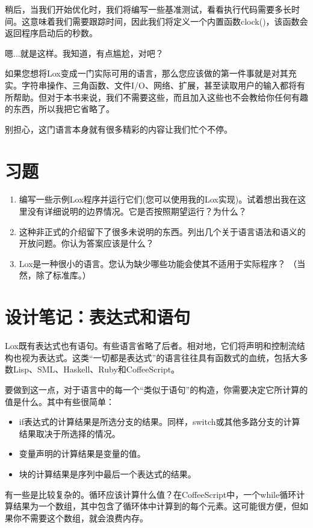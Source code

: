\documentclass[cn,11pt,chinese]{elegantbook}
\begin{document}
稍后，当我们开始优化时，我们将编写一些基准测试，看看执行代码需要多长时间。这意味着我们需要跟踪时间，因此我们将定义一个内置函数clock()，该函数会返回程序启动后的秒数。

嗯...就是这样。我知道，有点尴尬，对吧？ 

如果您想将Lox变成一门实际可用的语言，那么您应该做的第一件事就是对其充实。字符串操作、三角函数、文件I/O、网络、扩展，甚至读取用户的输入都将有所帮助。但对于本书来说，我们不需要这些，而且加入这些也不会教给你任何有趣的东西，所以我把它省略了。

别担心，这门语言本身就有很多精彩的内容让我们忙个不停。

\section{习题}

\begin{enumerate}
  \item 编写一些示例Lox程序并运行它们(您可以使用我的Lox实现)。试着想出我在这里没有详细说明的边界情况。它是否按照期望运行？为什么？
  \item 这种非正式的介绍留下了很多未说明的东西。列出几个关于语言语法和语义的开放问题。你认为答案应该是什么？
  \item Lox是一种很小的语言。您认为缺少哪些功能会使其不适用于实际程序？ （当然，除了标准库。）
\end{enumerate}

\section{设计笔记：表达式和语句}

Lox既有表达式也有语句。有些语言省略了后者。相对地，它们将声明和控制流结构也视为表达式。这类“一切都是表达式”的语言往往具有函数式的血统，包括大多数Lisp、SML、Haskell、Ruby和CoffeeScript。

要做到这一点，对于语言中的每一个“类似于语句”的构造，你需要决定它所计算的值是什么。其中有些很简单：

\begin{itemize}
  \item if表达式的计算结果是所选分支的结果。同样，switch或其他多路分支的计算结果取决于所选择的情况。
  \item 变量声明的计算结果是变量的值。
  \item 块的计算结果是序列中最后一个表达式的结果。
\end{itemize}

有一些是比较复杂的。循环应该计算什么值？在CoffeeScript中，一个while循环计算结果为一个数组，其中包含了循环体中计算到的每个元素。这可能很方便，但如果你不需要这个数组，就会浪费内存。
\end{document}
